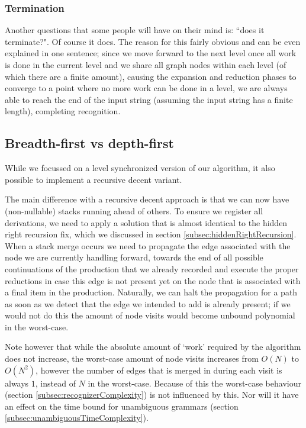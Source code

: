 \documentclass[a4paper,10pt]{article}
\begin{document}
\subsubsection{Termination}
Another questions that some people will have on their mind is: ``does it terminate?". Of course it does. The reason for this fairly obvious and can be even explained in one sentence; since we move forward to the next level once all work is done in the current level and we share all graph nodes within each level (of which there are a finite amount), causing the expansion and reduction phases to converge to a point where no more work can be done in a level, we are always able to reach the end of the input string (assuming the input string has a finite length), completing recognition.

\subsection{Breadth-first vs depth-first}
\label{sec:breadthFirstVsDepthFirst}

While we focussed on a level synchronized version of our algorithm, it also possible to implement a recursive decent variant.

The main difference with a recursive decent approach is that we can now have (non-nullable) stacks running ahead of others. To ensure we register all derivations, we need to apply a solution that is almost identical to the hidden right recursion fix, which we discussed in section \ref{subsec:hiddenRightRecursion}. When a stack merge occurs we need to propagate the edge associated with the node we are currently handling forward, towards the end of all possible continuations of the production that we already recorded and execute the proper reductions in case this edge is not present yet on the node that is associated with a final item in the production. Naturally, we can halt the propagation for a path as soon as we detect that the edge we intended to add is already present; if we would not do this the amount of node visits would become unbound polynomial in the worst-case.

Note however that while the absolute amount of `work' required by the algorithm does not increase, the worst-case amount of node visits increases from $O(N)$ to $O(N^2)$, however the number of edges that is merged in during each visit is always $1$, instead of $N$ in the worst-case. Because of this the worst-case behaviour (section \ref{subsec:recognizerComplexity}) is not influenced by this. Nor will it have an effect on the time bound for unambiguous grammars (section \ref{subsec:unambiguousTimeComplexity}).
\end{document}
